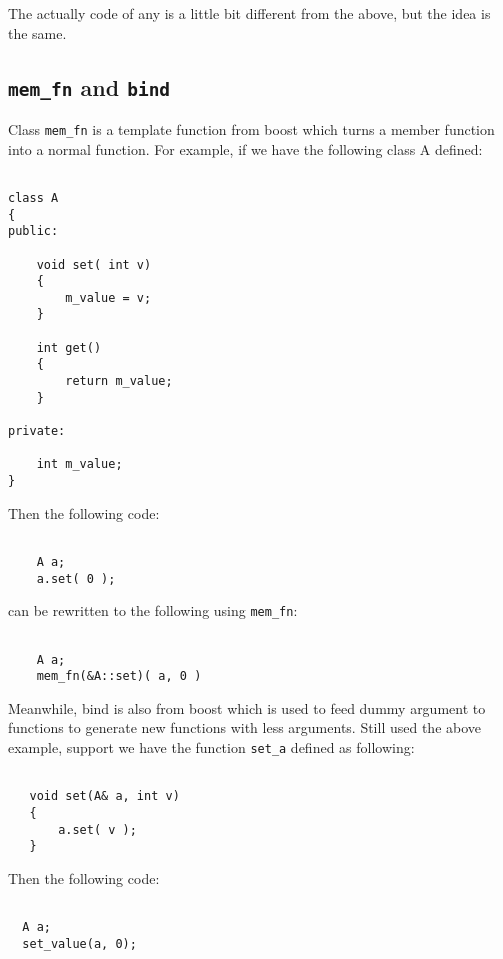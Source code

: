 \documentclass[letterpaper]{book}
\begin{document}
The actually code of any is a little bit different from the above, but the idea is the same.


\subsection{\lstinline$mem_fn$ and \lstinline$bind$}
 Class \lstinline$mem_fn$ is a template function from boost which turns a member function into 
a normal function. For example, if we have the following class A defined:

\begin{lstlisting}

class A
{
public: 

    void set( int v)
    {
        m_value = v;
    }

    int get()
    {
        return m_value;
    }

private:

    int m_value;
}

\end{lstlisting}

Then the following code:

\begin{lstlisting}

    A a;
    a.set( 0 );

\end{lstlisting}

can be rewritten to the following using \lstinline$mem_fn$:

\begin{lstlisting}

    A a;
    mem_fn(&A::set)( a, 0 )

\end{lstlisting}

Meanwhile,  bind is also from boost which is used to feed dummy argument to functions to generate 
new functions with less arguments. Still used the above example, support we have the function 
\lstinline$set_a$ defined as following:

\begin{lstlisting}

   void set(A& a, int v)
   {
       a.set( v );
   }

\end{lstlisting}

Then the following code:

\begin{lstlisting}

  A a;
  set_value(a, 0);

\end{lstlisting}
\end{document}
